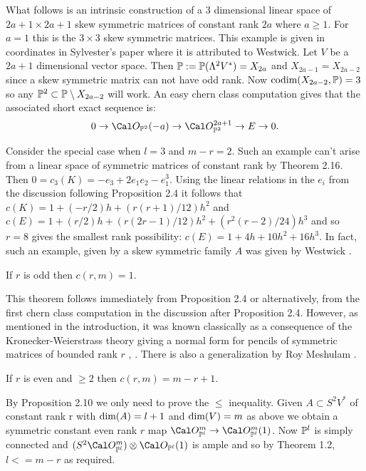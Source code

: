 What follows is an intrinsic construction of a 3 dimensional linear space
of $2a+1 \times 2a+1$ skew symmetric matrices of constant rank $2a$ where
$a \ge 1$. For $a=1$ this is the $3 \times 3$ skew symmetric matrices.
This example  is given in coordinates in Sylvester's paper 
\cite{S, pg 4} where it is attributed to Westwick.
Let $V$ be a $2a+1$ dimensional vector space. 
Then $\Bbb P := \Bbb P(\Lambda^2 V^*) = X_{2a}$
 and $X_{2a-1}= X_{2a-2}$ since a skew
symmetric matrix can not have odd rank. Now $\text{codim}( X_{2a-2}, \Bbb P) = 3$ so
any $\Bbb P^2 \subset \Bbb P \setminus X_{2a-2}$ will work.
An easy chern class computation gives that the associated short exact 
sequence is:
$$
0 \to \co_{\pp{2}}(-a) \to \co_{\pp{2}}^{2a+1} \to E \to 0.
$$


Consider the special case when $l=3$ and $m - r = 2$. Such
an example can't arise from a linear space of symmetric matrices of constant
rank by Theorem 2.16. Then  $0 = c_3(K) = -e_3 + 2e_1 e_2 -e_1^3$.
Using the  linear relations in the  $e_i$ from the discussion following
Proposition 2.4  
it follows that $c(K) = 1 + (-r/2)h + (r(r+1)/12)h^2$ and 
$c(E) = 1 + (r/2)h + (r(2r-1)/12)h^2 + (r^2(r-2)/24)h^3$ and so $r=8$ gives
the smallest rank possibility: $c(E) = 1 + 4h + 10h^2 + 16h^3$. In fact, 
such an example, given by a skew symmetric family $A$ was given by
Westwick \cite{W2, pg 168}. 
 

 If $r$ is odd then $c(r,m) = 1$.
\endproclaim

This theorem follows immediately from Proposition 2.4
or alternatively, from the first chern class computation in the
discussion after Proposition 2.4. However, as mentioned in the
introduction, it was known
classically as a consequence of the Kronecker-Weierstrass theory giving
a normal form for pencils of symmetric matrices of bounded rank $r$
\cite{G, Chp. XII}, \cite{HP, Chp. VIII, Sec. 10}.
There is also a generalization by Roy Meshulam \cite{M}.

 If $r$ is even and $\ge 2$ then $c(r,m) = m - r + 1$.
\endproclaim

By Proposition 2.10 we only need to prove the $\le$ inequality.
Given $A \subset S^2V^*$ of constant rank r 
with $\text{dim}(A) = l + 1$ and $\text{dim}(V) = m$
as above we obtain a symmetric constant even rank $r$ map 
$\co_{\pp{l}}^m \to \co_{\pp{l}}^m(1)$. Now $\Bbb P^{l}$ is simply connected
and $(S^2 \co_{\pp{l}}^{m}) \otimes \co_{\pp{l}}(1)$ is ample and so
by Theorem 1.2, $l <= m-r$ as required.
\enddemo


